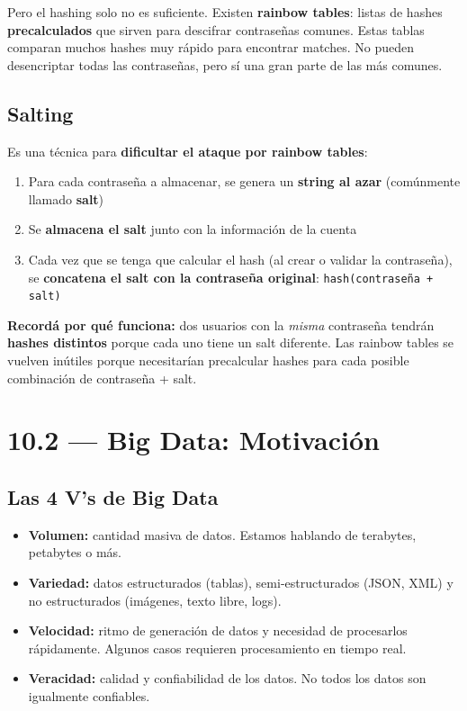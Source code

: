 \documentclass[11pt, a4paper]{article}
\begin{document}
Pero el hashing solo no es suficiente. Existen \textbf{rainbow tables}: listas de hashes \textbf{precalculados} que sirven para descifrar contraseñas comunes. Estas tablas comparan muchos hashes muy rápido para encontrar matches. No pueden desencriptar todas las contraseñas, pero sí una gran parte de las más comunes.

\subsection{Salting}

Es una técnica para \textbf{dificultar el ataque por rainbow tables}:

\begin{enumerate}
	\item Para cada contraseña a almacenar, se genera un \textbf{string al azar} (comúnmente llamado \textbf{salt})
	\item Se \textbf{almacena el salt} junto con la información de la cuenta
	\item Cada vez que se tenga que calcular el hash (al crear o validar la contraseña), se \textbf{concatena el salt con la contraseña original}: \texttt{hash(contraseña + salt)}
\end{enumerate}

\begin{recallbox}
	\textbf{Recordá por qué funciona:} dos usuarios con la \textit{misma} contraseña tendrán \textbf{hashes distintos} porque cada uno tiene un salt diferente. Las rainbow tables se vuelven inútiles porque necesitarían precalcular hashes para cada posible combinación de contraseña + salt.
\end{recallbox}

\section{10.2 — Big Data: Motivación}

\subsection{Las 4 V's de Big Data}
\begin{itemize}
	\item \textbf{Volumen:} cantidad masiva de datos. Estamos hablando de terabytes, petabytes o más.
	\item \textbf{Variedad:} datos estructurados (tablas), semi-estructurados (JSON, XML) y no estructurados (imágenes, texto libre, logs).
	\item \textbf{Velocidad:} ritmo de generación de datos y necesidad de procesarlos rápidamente. Algunos casos requieren procesamiento en tiempo real.
	\item \textbf{Veracidad:} calidad y confiabilidad de los datos. No todos los datos son igualmente confiables.
\end{itemize}
\end{document}
